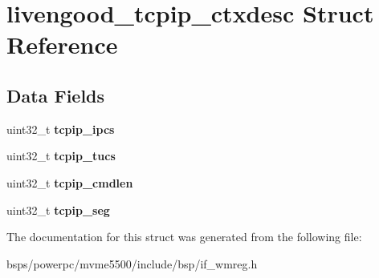 \hypertarget{structlivengood__tcpip__ctxdesc}{}\section{livengood\+\_\+tcpip\+\_\+ctxdesc Struct Reference}
\label{structlivengood__tcpip__ctxdesc}
\subsection*{Data Fields}
\begin{DoxyCompactItemize}
\item 
\mbox{\label{structlivengood__tcpip__ctxdesc_a0e947d7b9ec98d0682376ac3ab7bb73c}} 
uint32\+\_\+t {\bfseries tcpip\+\_\+ipcs}
\item 
\mbox{\label{structlivengood__tcpip__ctxdesc_ae87a55051a0cd65661b32520d1659c31}} 
uint32\+\_\+t {\bfseries tcpip\+\_\+tucs}
\item 
\mbox{\label{structlivengood__tcpip__ctxdesc_a698c70969f7a5f79d96b46ab0d34485c}} 
uint32\+\_\+t {\bfseries tcpip\+\_\+cmdlen}
\item 
\mbox{\label{structlivengood__tcpip__ctxdesc_a882ca89ab4f8d4c684497a8f5e9d6edc}} 
uint32\+\_\+t {\bfseries tcpip\+\_\+seg}
\end{DoxyCompactItemize}


The documentation for this struct was generated from the following file\+:\begin{DoxyCompactItemize}
\item 
bsps/powerpc/mvme5500/include/bsp/if\+\_\+wmreg.\+h\end{DoxyCompactItemize}
